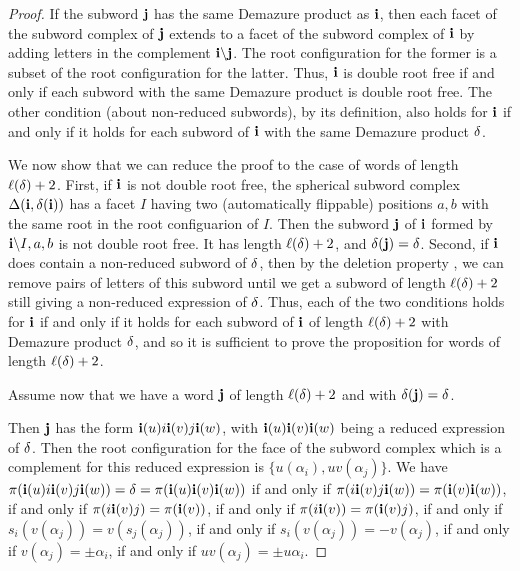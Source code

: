 \begin{proof}
 If the subword $\mathbf{j}$ has the same Demazure product as $\mathbf{i}$, then each facet of the subword complex of $\mathbf{j}$ extends to a facet of the subword complex of $\mathbf{i}$ by adding letters in the complement $\mathbf{i} \backslash \mathbf{j}$. The root configuration for the former is a subset of the root configuration for the latter. Thus, $\mathbf{i}$ is double root free if and only if each subword with the same Demazure product is double root free. The other condition (about non-reduced subwords), by 
 its definition, also holds for $\mathbf{i}$ if and only if it holds for each subword of $\mathbf{i}$ with the same Demazure product $\operatorname{\delta}$.

 We now show that we can reduce the proof to the case of words of length $\ell(\operatorname{\delta}) +2$. First, if $\mathbf{i}$ is not double root free, the spherical subword complex $\Delta(\mathbf{i}, \operatorname{\delta}(\mathbf{i}))$ has a facet $I$ having two (automatically flippable) positions $a, b$ with the same root in the root configuarion of $I$.  Then the subword $\mathbf{j}$ of $\mathbf{i}$ formed by $\mathbf{i} \backslash I, a, b$ is not double root free.  It has length $\ell(\operatorname{\delta}) + 2$, and $\operatorname{\delta}(\mathbf{j}) = \operatorname{\delta}$. 
 Second, if $\mathbf{i}$ does contain a non-reduced subword of $\operatorname{\delta}$, then by the deletion property \cite[Proposition 1.4.7]{bb_coxeter}, we can remove pairs of letters of this subword until we get a subword of length $\ell(\operatorname{\delta}) + 2$ still giving a non-reduced expression of $\operatorname{\delta}$. Thus, each of the two conditions holds for $\mathbf{i}$ if and only if it holds for each subword of $\mathbf{i}$ of length $\ell(\operatorname{\delta}) + 2$ with Demazure product $\operatorname{\delta}$, and so it is sufficient to prove the proposition for words of length $\ell(\operatorname{\delta}) + 2$. 



Assume now that we have a word $\mathbf{j}$ of length $\ell(\operatorname{\delta}) + 2$ and with $\operatorname{\delta}(\mathbf{j}) = \operatorname{\delta}$. 

Then $\mathbf{j}$ has the form $\mathbf{i}(u) i \mathbf{i}(v) j \mathbf{i}(w)$, with $\mathbf{i}(u)\mathbf{i}(v)\mathbf{i}(w)$ being a reduced expression of $\operatorname{\delta}$. Then the root configuration for the face of the subword complex which is a complement for this reduced expression is $\{u(\alpha_i), uv(\alpha_j)\}$. We have $\pi(\mathbf{i}(u)i \mathbf{i}(v) j \mathbf{i}(w)) = \operatorname{\delta} = \pi(\mathbf{i}(u)\mathbf{i}(v)\mathbf{i}(w))$ if and only if $\pi(i \mathbf{i}(v) j \mathbf{i}(w)) = \pi(\mathbf{i}(v)\mathbf{i}(w))$, if and only if 
$\pi(i \mathbf{i}(v) j) = \pi(\mathbf{i}(v))$, if and only if $\pi(i \mathbf{i}(v)) = \pi(\mathbf{i}(v) j)$, if and only if $s_i (v (\alpha_j)) = v(s_j(\alpha_j))$, if and only if $s_i(v(\alpha_j)) = - v(\alpha_j)$, if and only if $v(\alpha_j) = \pm \alpha_i$, if and only if $uv(\alpha_j) = \pm u\alpha_i$. 



\end{proof}
